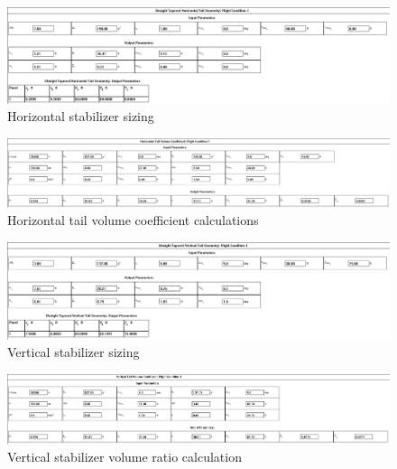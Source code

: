 \documentclass[conf]{new-aiaa}
\begin{document}
\begin{figure}[H]
    \includegraphics[width=\textwidth]{Report3Printouts/Empannage/Horizontal_geometry_cropped.png}
    \caption{Horizontal stabilizer sizing}
    \label{fig:horizontal_geometry}
\end{figure}

\begin{figure}[H]
    \includegraphics[width=\textwidth]{Report3Printouts/Empannage/Horizontal_volumeratio_cropped.png}
    \caption{Horizontal tail volume coefficient calculations}
    \label{fig:horizontal_volumeratio}
\end{figure}

\begin{figure}[H]
    \includegraphics[width=\textwidth]{Report3Printouts/Empannage/Vertical_geometry_cropped.png}
    \caption{Vertical stabilizer sizing}
    \label{fig:vertical_geometry}
\end{figure}

\begin{figure}[H]
    \includegraphics[width=\textwidth]{Report3Printouts/Empannage/Vertical_volumeratio_cropped.png}
    \caption{Vertical stabilizer volume ratio calculation}
    \label{fig:vertical_volumeratio}
\end{figure}
\end{document}
